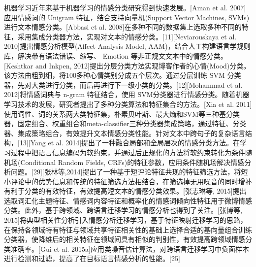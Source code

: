 机器学习近年来基于机器学习的情感分类研究得到快速发展。[Aman et al. 2007]应用情感词的 Unigram 特征，结合支持向量机(Support Vector Machines, SVMs)进行文本情感分类。[Abbasi et al. 2008]在多种不同的数据集上选取多种不同的特征，采用集成分类器方法，实现对文本的情感分类。[11][Neviarouskaya et al. 2010]提出情感分析模型(Affect Analysis Model, AAM)，结合人工构建语言学规则库，解决带有语法错误、缩写、 Emotion 等非正规文文本中的情感分类。[Keshtkar and Inkpen, 2012]提出分层分类方法实现博客作者的心情(Mood)分类。该方法由粗到细，将100多种心情类别分成五个层次。通过分层训练 SVM 分类器，先对大类进行分类，而后再进行下一级小类的分类。[12][Mohammad et al. 2012]将情感词典与 n-gram 特征结合，使用 SVM分类器进行情感分类。随着机器学习技术的发展，研究者提出了多种分类算法和特征集合的方法。[Xia et al. 2011]使用词性、词的关系两大类特征集，朴素贝叶斯、最大熵和SVM等三种基分类器，固定组合、权重组合和meta-classifier三种分类器集成策略，通过特征、分类器、集成策略组合，有效提升文本情感分类性能。针对文本中跨句子的复杂语言结构，[13][Yang et al. 2014]提出了一种融合局部和全局层次的情感分类方法。在学习过程中把语言信息编码为软约束，并通过后正规化的方法将软约束转化为条件随机场(Conditional Random Fields, CRFs)的特征参数，应用条件随机场解决情感分析问题。[29][张林等,2014]提出了一种基于短评论特征共现的特征筛选方法，将短小评论中的优势信息和传统的特征筛选方法相结合，在筛选掉无用噪音的同时增补有利于分类的有效特征，有效提高短文本的情感分类效果。[张志琳等, 2015]提出选取词汇化主题特征、情感词内容特征和概率化的情感词倾向性特征用于微博情感分类。此外，基于跨领域、跨语言迁移学习的情感分析也得到了关注。[张博等, 2015]将典型相关性分析引入情感分析迁移学习，基于特征映射迁移学习的思路，在保持各领域特有特征与领域共享特征相关性的基础上选择合适的基向量组合训练分类器，使降维后的相关特征在领域间具有相似的判别性，有效提高跨领域情感分类准确率。[Gui et al. 2015a]应用类噪音估计算法，对跨语言迁移学习中负面样本进行检测和过滤，提高了在目标语言情感分析的性能。[25]


